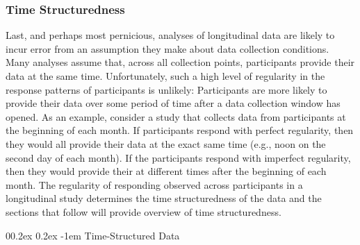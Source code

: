 \documentclass[
  english,
  man,floatsintext]{apa7}
\makeatletter
\let\oldparagraph\paragraph
\renewcommand{\paragraph}[1]{\oldparagraph{#1}\mbox{}}
\renewcommand{\paragraph}{\@startsection{paragraph}{4}{\parindent}%
  {0\baselineskip \@plus 0.2ex \@minus 0.2ex}%
  {-1em}%
  {\normalfont\normalsize\bfseries\itshape\typesectitle}}
\renewcommand{\paragraph}{\@startsection{paragraph}{4}{\parindent}%
  {0\baselineskip \@plus 0.2ex \@minus 0.2ex}%
  {-1em}%
  {\normalfont\normalsize\bfseries\typesectitle}}
\makeatother
\begin{document}
\hypertarget{time-structuredness}{%
\subsubsection{Time Structuredness}\label{time-structuredness}}

Last, and perhaps most pernicious, analyses of longitudinal data are likely to incur error from an assumption they make about data collection conditions. Many analyses assume that, across all collection points, participants provide their data at the same time. Unfortunately, such a high level of regularity in the response patterns of participants is unlikely: Participants are more likely to provide their data over some period of time after a data collection window has opened. As an example, consider a study that collects data from participants at the beginning of each month. If participants respond with perfect regularity, then they would all provide their data at the exact same time (e.g., noon on the second day of each month). If the participants respond with imperfect regularity, then they would provide their at different times after the beginning of each month. The regularity of responding observed across participants in a longitudinal study determines the time structuredness of the data and the sections that follow will provide overview of time structuredness.

\hypertarget{time-structured-data}{%
\paragraph{Time-Structured Data}\label{time-structured-data}}
\end{document}
